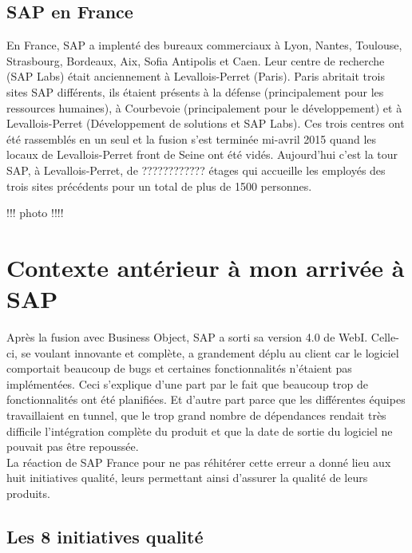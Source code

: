 \subsection{SAP en France}
En France, SAP a implenté des bureaux commerciaux à Lyon, Nantes, Toulouse, Strasbourg, Bordeaux, Aix, Sofia Antipolis et Caen. Leur centre de recherche (SAP Labs) était anciennement à Levallois-Perret (Paris). Paris abritait trois sites SAP différents, ils étaient présents à la défense (principalement pour les ressources humaines), à Courbevoie (principalement pour le développement) et à Levallois-Perret (Développement de solutions et SAP Labs). Ces trois centres ont été rassemblés en un seul et la fusion s'est terminée mi-avril 2015 quand les locaux de Levallois-Perret front de Seine ont été vidés. Aujourd'hui c'est la tour SAP, à Levallois-Perret, de ???????????? étages qui accueille les employés des trois sites précédents pour un total de plus de 1500 personnes.

!!! photo !!!!

\section{Contexte antérieur à mon arrivée à SAP}

Après la fusion avec Business Object, SAP a sorti sa version 4.0 de WebI. Celle-ci, se voulant innovante et complète, a grandement déplu au client car le logiciel comportait beaucoup de bugs et certaines fonctionnalités n'étaient pas implémentées. 
Ceci s'explique d'une part par le fait que beaucoup trop de fonctionnalités ont été planifiées. Et d'autre part parce que les différentes équipes travaillaient en tunnel, que le trop grand nombre de dépendances rendait très difficile l'intégration complète du produit et que la date de sortie du logiciel ne pouvait pas être repoussée.\\
La réaction de SAP France pour ne pas réhitérer cette erreur a donné lieu aux huit initiatives qualité, leurs permettant ainsi d'assurer la qualité de leurs produits.

\subsection{Les 8 initiatives qualité}
